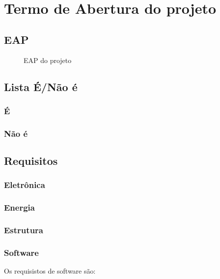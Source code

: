 \chapter{Termo de Abertura do projeto}

\section{EAP}
\begin{figure}[!htb]
    \caption{\label{fig:eap} EAP do projeto}
\end{figure}
\section{Lista É/Não é}
\subsection{É}
\subsection{Não é}
\section{Requisitos}
\subsection{Eletrônica}
\subsection{Energia}
\subsection{Estrutura}
\subsection{Software}

Os requisistos de software são:

